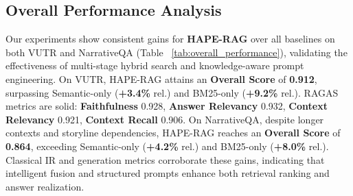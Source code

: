 \documentclass[10pt,twocolumn,letterpaper]{article}
\begin{document}
\subsection{Overall Performance Analysis}
Our experiments show consistent gains for \textbf{HAPE-RAG} over all baselines on both VUTR and NarrativeQA (Table ~\ref{tab:overall_performance}), validating the effectiveness of multi-stage hybrid search and knowledge-aware prompt engineering. On VUTR, HAPE-RAG attains an \textbf{Overall Score} of \textbf{0.912}, surpassing Semantic-only (\textbf{+3.4\%} rel.) and BM25-only (\textbf{+9.2\%} rel.). RAGAS metrics are solid: \textbf{Faithfulness} 0.928, \textbf{Answer Relevancy} 0.932, \textbf{Context Relevancy} 0.921, \textbf{Context Recall} 0.906. On NarrativeQA, despite longer contexts and storyline dependencies, HAPE-RAG reaches an \textbf{Overall Score} of \textbf{0.864}, exceeding Semantic-only (\textbf{+4.2\%} rel.) and BM25-only (\textbf{+8.0\%} rel.). Classical IR and generation metrics corroborate these gains, indicating that intelligent fusion and structured prompts enhance both retrieval ranking and answer realization.
\end{document}
